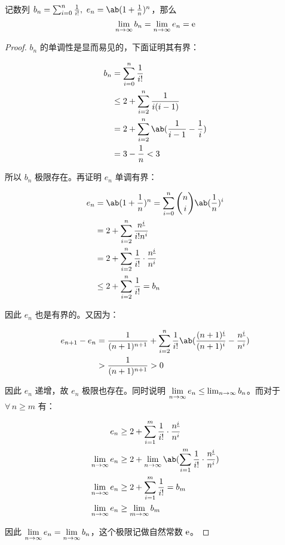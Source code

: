 \begin{theorem}
	记数列 $b_n = \sum_{i=0}^n \frac{1}{i!},\ e_n = \ab(1 + \frac{1}{n})^n$，那么
	$$
	\lim_{n \to \infty} b_n = \lim_{n \to \infty} e_n = \mathrm{e}
	$$

	\begin{proof}
		$b_n$ 的单调性是显而易见的，下面证明其有界：
		
		$$
		\begin{aligned}
			b_n & = \sum_{i=0}^n \frac{1}{i!} \\
			& \le 2 + \sum_{i=2}^n \frac{1}{i(i-1)} \\
			& = 2 + \sum_{i=2}^n \ab(\frac{1}{i-1} - \frac{1}{i}) \\
			& = 3 - \frac{1}{n} < 3
		\end{aligned}
		$$

		所以 $b_n$ 极限存在。再证明 $e_n$ 单调有界：

		$$
		\begin{aligned}
			e_n & = \ab(1 + \frac{1}{n})^n = \sum_{i=0}^n \binom{n}{i} \ab(\frac{1}{n})^i \\
			& = 2 + \sum_{i=2}^n \frac{n^{\underline{i}}}{i! n^i} \\
			& = 2 + \sum_{i=2}^n \frac{1}{i!} \cdot \frac{n^{\underline{i}}}{n^i} \\
			& \le 2 + \sum_{i=2}^n \frac{1}{i!} = b_n
		\end{aligned}
		$$

		因此 $e_n$ 也是有界的。又因为：

		$$
		\begin{aligned}
			e_{n+1} - e_n & = \frac{1}{(n+1)^{n+1}} + \sum_{i=2}^{n} \frac{1}{i!} \ab(\frac{(n+1)^{\underline{i}}}{(n+1)^i} - \frac{n^{\underline{i}}}{n^i}) \\
			& > \frac{1}{(n+1)^{n+1}} > 0
		\end{aligned}
		$$

		因此 $e_n$ 递增，故 $e_n$ 极限也存在。同时说明 $\lim\limits\limits_{n \to \infty} e_n \le \lim_{n \to \infty} b_n$。而对于 $\forall\,n \ge m$ 有：

		$$
		\begin{aligned}
			e_n & \ge 2 + \sum_{i=1}^m \frac{1}{i!} \cdot \frac{n^{\underline{i}}}{n^i} \\
			\lim_{n \to \infty} e_n & \ge 2 + \lim_{n \to \infty} \ab(\sum_{i=1}^m \frac{1}{i!} \cdot \frac{n^{\underline{i}}}{n^i}) \\
			\lim_{n \to \infty} e_n & \ge 2 + \sum_{i=1}^m \frac{1}{i!} = b_m \\
			\lim_{n \to \infty} e_n & \ge \lim_{m \to \infty} b_m \\
		\end{aligned}
		$$

		因此 $\lim\limits\limits_{n \to \infty} e_n = \lim\limits_{n \to \infty} b_n$，这个极限记做自然常数 $\mathrm{e}$。
	\end{proof}
\end{theorem}


